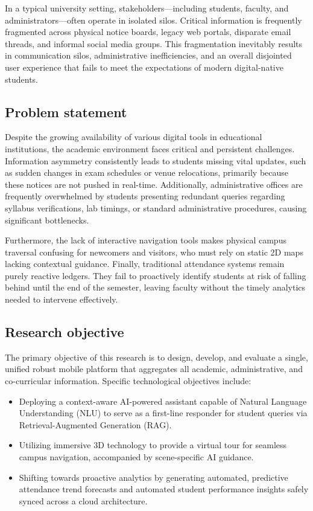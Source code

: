 \documentclass[]{einformatica}
\begin{document}
In a typical university setting, stakeholders—including students, faculty, and administrators—often operate in isolated silos. Critical information is frequently fragmented across physical notice boards, legacy web portals, disparate email threads, and informal social media groups. This fragmentation inevitably results in communication silos, administrative inefficiencies, and an overall disjointed user experience that fails to meet the expectations of modern digital-native students.

\subsection*{Problem statement} 

Despite the growing availability of various digital tools in educational institutions, the academic environment faces critical and persistent challenges. Information asymmetry consistently leads to students missing vital updates, such as sudden changes in exam schedules or venue relocations, primarily because these notices are not pushed in real-time. Additionally, administrative offices are frequently overwhelmed by students presenting redundant queries regarding syllabus verifications, lab timings, or standard administrative procedures, causing significant bottlenecks. 

Furthermore, the lack of interactive navigation tools makes physical campus traversal confusing for newcomers and visitors, who must rely on static 2D maps lacking contextual guidance. Finally, traditional attendance systems remain purely reactive ledgers. They fail to proactively identify students at risk of falling behind until the end of the semester, leaving faculty without the timely analytics needed to intervene effectively.

\subsection*{Research objective}

The primary objective of this research is to design, develop, and evaluate a single, unified robust mobile platform that aggregates all academic, administrative, and co-curricular information. Specific technological objectives include:
\begin{itemize}
    \item Deploying a context-aware AI-powered assistant capable of Natural Language Understanding (NLU) to serve as a first-line responder for student queries via Retrieval-Augmented Generation (RAG).
    \item Utilizing immersive 3D technology to provide a virtual tour for seamless campus navigation, accompanied by scene-specific AI guidance.
    \item Shifting towards proactive analytics by generating automated, predictive attendance trend forecasts and automated student performance insights safely synced across a cloud architecture.
\end{itemize}
\end{document}
